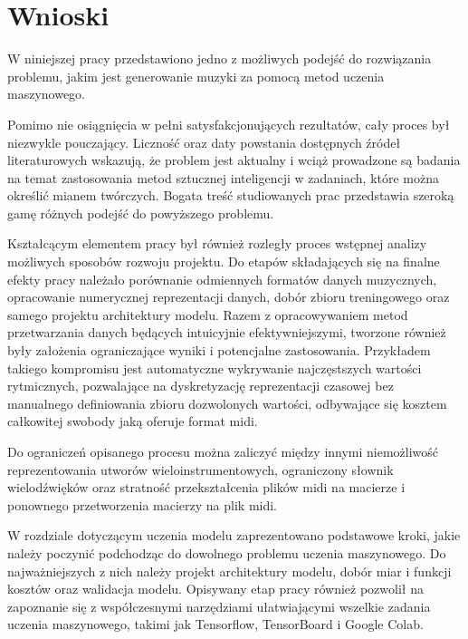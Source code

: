 \chapter{Wnioski}
{
    W niniejszej pracy przedstawiono jedno z możliwych podejść do rozwiązania problemu,
    jakim jest generowanie muzyki za pomocą metod uczenia maszynowego. 

    Pomimo nie osiągnięcia w pełni satysfakcjonujących rezultatów, cały proces był niezwykle pouczający. 
    Liczność oraz daty powstania dostępnych źródeł literaturowych wskazują, że problem jest aktualny 
    i wciąż prowadzone są badania na temat zastosowania metod sztucznej inteligencji w zadaniach, 
    które można określić mianem twórczych. Bogata treść studiowanych prac przedstawia szeroką gamę 
    różnych podejść do powyższego problemu.

    Kształcącym elementem pracy był również rozległy proces wstępnej analizy możliwych sposobów
    rozwoju projektu. Do etapów składających się na finalne efekty pracy należało porównanie odmiennych 
    formatów danych muzycznych, opracowanie numerycznej reprezentacji danych, dobór zbioru treningowego
    oraz samego projektu architektury modelu. 
    Razem z opracowywaniem metod przetwarzania danych będących intuicyjnie efektywniejszymi, tworzone również były założenia
    ograniczające wyniki i potencjalne zastosowania. Przykładem takiego kompromisu jest automatyczne wykrywanie
    najczęstszych wartości rytmicznych, pozwalające na dyskretyzację reprezentacji czasowej bez
    manualnego definiowania zbioru dozwolonych wartości, odbywające się kosztem całkowitej swobody jaką oferuje format midi.
    
    Do ograniczeń opisanego procesu można zaliczyć między innymi niemożliwość reprezentowania utworów wieloinstrumentowych, 
    ograniczony słownik wielodźwięków oraz stratność przekształcenia plików midi na macierze i ponownego przetworzenia
    macierzy na plik midi.

    W rozdziale dotyczącym uczenia modelu zaprezentowano podstawowe kroki, jakie należy poczynić podchodząc do
    dowolnego problemu uczenia maszynowego. Do najważniejszych z nich należy projekt architektury modelu,
    dobór miar i funkcji kosztów oraz walidacja modelu. Opisywany etap pracy również pozwolił na zapoznanie 
    się z współczesnymi narzędziami ułatwiającymi wszelkie zadania uczenia maszynowego, takimi jak Tensorflow, 
    TensorBoard i Google Colab. 

    \bigskip

}
